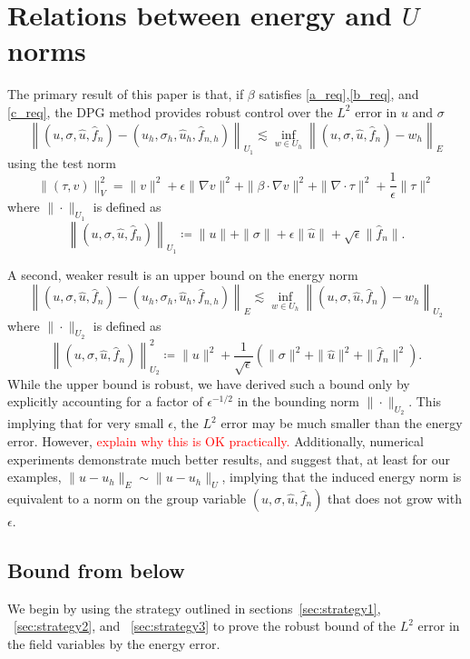 \documentclass[11pt,onecolumn]{scrartcl}
\newcommand{\grad}{\nabla}
\renewcommand{\div}{\grad \cdot}
\begin{document}
\section{Relations between energy and $U$ norms}

The primary result of this paper is that, if $\beta$ satisfies \ref{a_req},\ref{b_req}, and \ref{c_req}, the DPG method provides robust control over the $L^2$ error in $u$ and $\sigma$
\[
\left\|\left(u,\sigma,\widehat{u},\widehat{f}_n\right)-\left(u_h,\sigma_h,\widehat{u}_h,\widehat{f}_{n,h}\right)\right\|_{U_1} \lesssim \inf_{w\in U_h}\left\|\left(u,\sigma,\widehat{u},\widehat{f}_n\right)-w_h \right\|_{E}
\]
using the test norm
\[
\|\left(\tau, v\right)\|_{V}^2 = \|v\|^2 + \epsilon \|\grad v\|^2 + \|\beta \cdot \grad v\|^2 + \| \div \tau\|^2 + \frac{1}{\epsilon}\|\tau\|^2
\]
where $\|\cdot \|_{U_1}$ is defined as
\[
\left\|\left(u,\sigma,\widehat{u},\widehat{f}_n\right)\right\|_{U_1} \coloneqq \|u\| + \|\sigma\| + \epsilon\|\widehat{u}\|+\sqrt{\epsilon} \|\widehat{f}_n\|.
\]

A second, weaker result is an upper bound on the energy norm
\[
\left\|\left(u,\sigma,\widehat{u},\widehat{f}_n\right)-\left(u_h,\sigma_h,\widehat{u}_h,\widehat{f}_{n,h}\right)\right\|_{E} \lesssim \inf_{w\in U_h}\left\|\left(u,\sigma,\widehat{u},\widehat{f}_n\right)-w_h\right\|_{U_2}
\]
where $\|\cdot \|_{U_2}$ is defined as
\[
\left\|\left(u,\sigma,\widehat{u},\widehat{f}_n\right)\right\|_{U_2}^2 \coloneqq \|u\|^2 + \frac{1}{\sqrt{\epsilon}}\left(\|\sigma\|^2 + \|\widehat{u}\|^2+ \|\widehat{f}_n\|^2\right).
\]
While the upper bound is robust, we have derived such a bound only by explicitly accounting for a factor of $\epsilon^{-1/2}$ in the bounding norm $\|\cdot \|_{U_2}$.  This implying that for very small $\epsilon$, the $L^2$ error may be much smaller than the energy error.  However, \textcolor{red}{explain why this is OK practically.}
Additionally, numerical experiments demonstrate much better results, and suggest that, at least for our examples, $\|u-u_h\|_E \sim \|u-u_h\|_{U}$, implying that the induced energy norm is equivalent to a norm on the group variable $\left(u,\sigma,\widehat{u},\widehat{f}_n\right)$ that does not grow with $\epsilon$.  

\subsection{Bound from below}

We begin by using the strategy outlined in sections~\ref{sec:strategy1}, ~\ref{sec:strategy2}, and ~\ref{sec:strategy3} to prove the robust bound of the $L^2$ error in the field variables by the energy error.  
\end{document}
